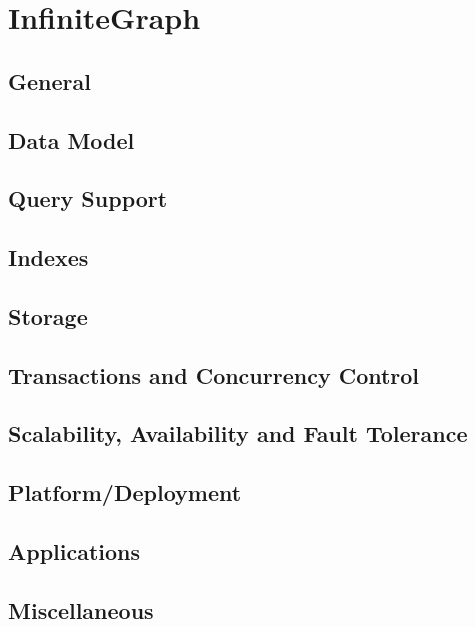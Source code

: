 \section{InfiniteGraph}

\subsection{General}


\subsection{Data Model}


\subsection{Query Support}


\subsection{Indexes}


\subsection{Storage}


\subsection{Transactions and Concurrency Control}


\subsection{Scalability, Availability and Fault Tolerance}


\subsection{Platform/Deployment}


\subsection{Applications}


\subsection{Miscellaneous}


\newpage